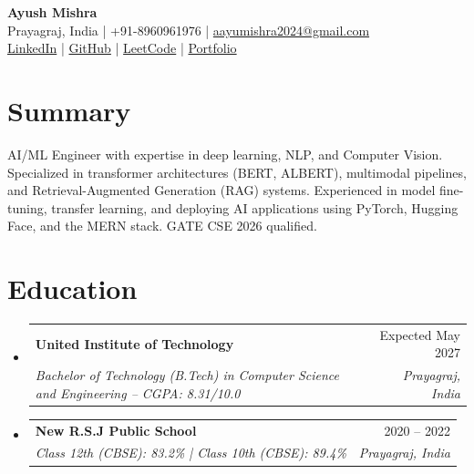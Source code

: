 \documentclass[letterpaper,10pt]{article}
\makeatletter
\newcommand{\resumeSubheading}[4]{
  \vspace{-3pt}\item
    \begin{tabular*}{\linewidth}[t]{l@{\extracolsep{\fill}}r}
      \textbf{#1} & #2 \\
      \textit{\small#3} & \textit{\small #4} \\
    \end{tabular*}\vspace{-7pt}
}
\newcommand{\resumeSubHeadingListStart}{\begin{itemize}[leftmargin=0.15in, label={}]}
\newcommand{\resumeSubHeadingListEnd}{\end{itemize}\vspace{-5pt}}
\makeatother
\begin{document}
\begin{center}
    {\Huge \textbf{Ayush Mishra}} \\ \vspace{2pt}
    \small Prayagraj, India | +91-8960961976 | \href{mailto:aayumishra2024@gmail.com}{aayumishra2024@gmail.com} \\ \vspace{2pt}
    \small 
    \href{https://www.linkedin.com/in/ayush-mishra-14a608281/}{LinkedIn} | 
    \href{https://github.com/Ayush120704/Ayush120704}{GitHub} | 
    \href{https://leetcode.com/u/ayushmishra12345/}{LeetCode} | 
    \href{https://ayush-portfolio-psi-one.vercel.app/}{Portfolio}
\end{center}
\vspace{-10pt}

\section{Summary}
\vspace{-2pt}
\small{AI/ML Engineer with expertise in deep learning, NLP, and Computer Vision. Specialized in transformer architectures (BERT, ALBERT), multimodal pipelines, and Retrieval-Augmented Generation (RAG) systems. Experienced in model fine-tuning, transfer learning, and deploying AI applications using PyTorch, Hugging Face, and the MERN stack. GATE CSE 2026 qualified.}
\vspace{-2pt}

\section{Education}
  \resumeSubHeadingListStart
    \resumeSubheading
      {United Institute of Technology}{Expected May 2027}
      {Bachelor of Technology (B.Tech) in Computer Science and Engineering -- CGPA: 8.31/10.0}{Prayagraj, India}
    \resumeSubheading
      {New R.S.J Public School}{2020 -- 2022}
      {Class 12th (CBSE): 83.2\% | Class 10th (CBSE): 89.4\%}{Prayagraj, India}
  \resumeSubHeadingListEnd

\end{document}
